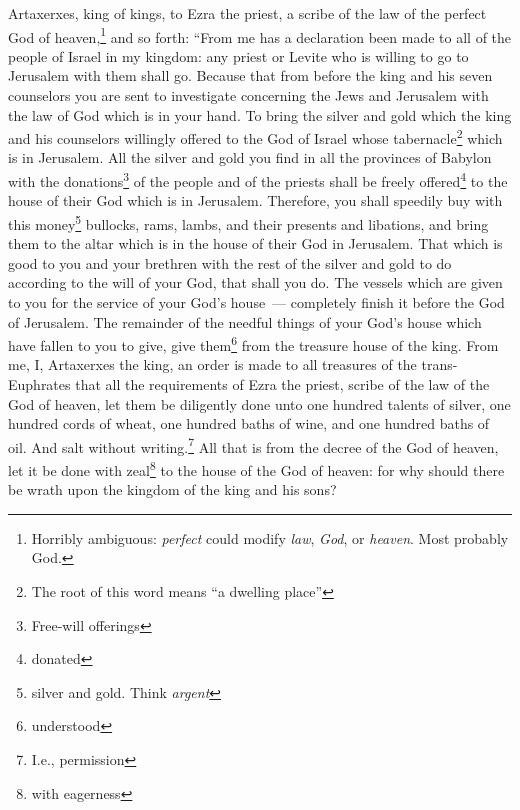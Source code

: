 \begin{enumerate}[align=center]
     Artaxerxes, king of kings, to Ezra the priest, a scribe of the law of the perfect God of heaven,\footnote{Horribly ambiguous: \textit{perfect} could modify \textit{law}, \textit{God}, or \textit{heaven}. Most probably God.} and so forth:%
     ``From me has a declaration been made to all of the people of Israel in my kingdom: any priest or Levite who is willing to go to Jerusalem with them shall go.%
     Because that from before the king and his seven counselors you are sent to investigate concerning the Jews and Jerusalem with the law of God which is in your hand.%
     To bring the silver and gold which the king and his counselors willingly offered to the God of Israel whose tabernacle\footnote{The root of this word means ``a dwelling place''} which is in Jerusalem.%
     All the silver and gold you find in all the provinces of Babylon with the donations\footnote{Free-will offerings} of the people and of the priests shall be freely offered\footnote{donated} to the house of their God which is in Jerusalem.%
     Therefore, you shall speedily buy with this money\footnote{silver and gold. Think \textit{argent}} bullocks, rams, lambs, and their presents and libations, and bring them to the altar which is in the house of their God in Jerusalem.%
     That which is good to you and your brethren with the rest of the silver and gold to do according to the will of your God, that shall you do.%
     The vessels which are given to you for the service of your God's house~--- completely finish it before the God of Jerusalem.%
     The remainder of the needful things of your God's house which have fallen to you to give, give them\footnote{understood} from the treasure house of the king.%
     From me, I, Artaxerxes the king, an order is made to all treasures of the trans-Euphrates that all the requirements of Ezra the priest, scribe of the law of the God of heaven, let them be diligently done%
     unto one hundred talents of silver, one hundred cords of wheat, one hundred baths of wine, and one hundred baths of oil. And salt without writing.\footnote{I.e., permission}%
     All that is from the decree of the God of heaven, let it be done with zeal\footnote{with eagerness} to the house of the God of heaven: for why should there be wrath upon the kingdom of the king and his sons?%

\end{enumerate}
